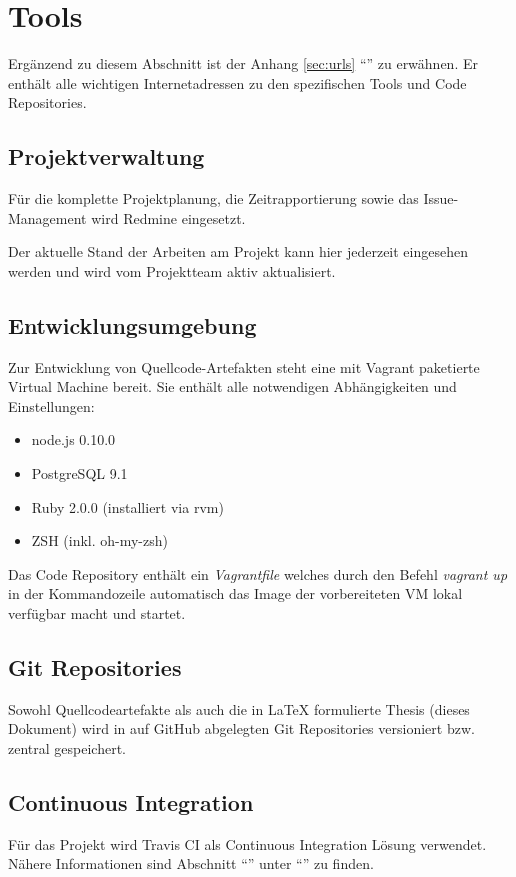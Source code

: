 \section{Tools}
\label{sec:tools}

Ergänzend zu diesem Abschnitt ist der Anhang \ref{sec:urls} ``'' zu erwähnen. Er enthält alle wichtigen Internetadressen zu den spezifischen Tools und Code Repositories.

\subsection{Projektverwaltung}
Für die komplette Projektplanung, die Zeitrapportierung sowie das Issue-Management wird Redmine eingesetzt.

Der aktuelle Stand der Arbeiten am Projekt kann hier jederzeit eingesehen werden und wird vom Projektteam aktiv aktualisiert.


\subsection{Entwicklungsumgebung}
Zur Entwicklung von Quellcode-Artefakten steht eine mit Vagrant \cite{Vagrant} paketierte Virtual Machine bereit. Sie enthält alle notwendigen Abhängigkeiten und Einstellungen:


\begin{itemize}
	\item node.js 0.10.0
	\item PostgreSQL 9.1
	\item Ruby 2.0.0 (installiert via rvm)
	\item ZSH (inkl. oh-my-zsh)
\end{itemize}

Das Code Repository enthält ein \emph{Vagrantfile} welches durch den Befehl \emph{vagrant up} in der Kommandozeile automatisch das Image der vorbereiteten VM lokal verfügbar macht und startet.

\subsection{Git Repositories}
Sowohl Quellcodeartefakte als auch die in LaTeX formulierte Thesis (dieses Dokument) wird in auf GitHub abgelegten Git Repositories versioniert bzw. zentral gespeichert.

\subsection{Continuous Integration}
Für das Projekt wird Travis CI als Continuous Integration Lösung verwendet. Nähere Informationen sind Abschnitt ``'' unter ``'' zu finden.